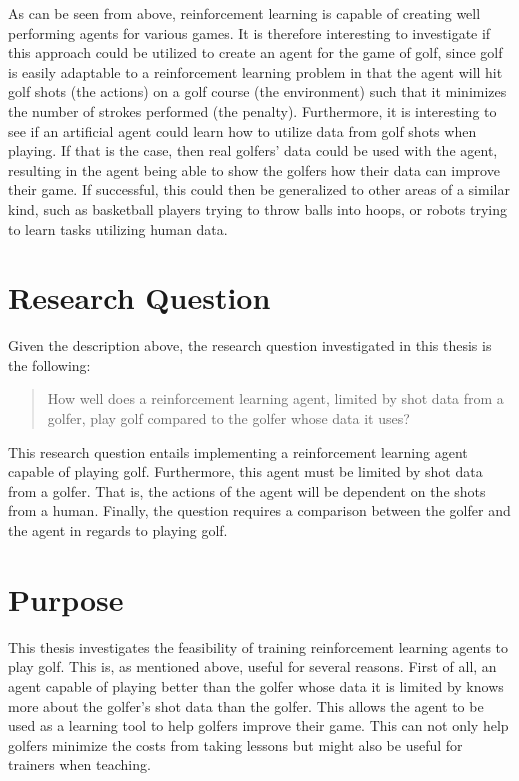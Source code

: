 \documentclass{kththesis}
\begin{document}
As can be seen from above, reinforcement learning is capable of creating well performing agents for various games. It is therefore interesting to investigate if this approach could be utilized to create an agent for the game of golf, since golf is easily adaptable to a reinforcement learning problem in that the agent will hit golf shots (the actions) on a golf course (the environment) such that it minimizes the number of strokes performed (the penalty). Furthermore, it is interesting to see if an artificial agent could learn how to utilize data from golf shots when playing. If that is the case, then real golfers' data could be used with the agent, resulting in the agent being able to show the golfers how their data can improve their game. If successful, this could then be generalized to other areas of a similar kind, such as basketball players trying to throw balls into hoops, or robots trying to learn tasks utilizing human data.

\section{Research Question}
Given the description above, the research question investigated in this thesis is the following:
\begin{quote}
    How well does a reinforcement learning agent, limited by shot data from a golfer, play golf compared to the golfer whose data it uses?
\end{quote}
This research question entails implementing a reinforcement learning agent capable of playing golf. Furthermore, this agent must be limited by shot data from a golfer. That is, the actions of the agent will be dependent on the shots from a human. Finally, the question requires a comparison between the golfer and the agent in regards to playing golf. 

\section{Purpose}
This thesis investigates the feasibility of training reinforcement learning agents to play golf. This is, as mentioned above, useful for several reasons. First of all, an agent capable of playing better than the golfer whose data it is limited by knows more about the golfer's shot data than the golfer. This allows the agent to be used as a learning tool to help golfers improve their game. This can not only help golfers minimize the costs from taking lessons but might also be useful for trainers when teaching.
\end{document}
